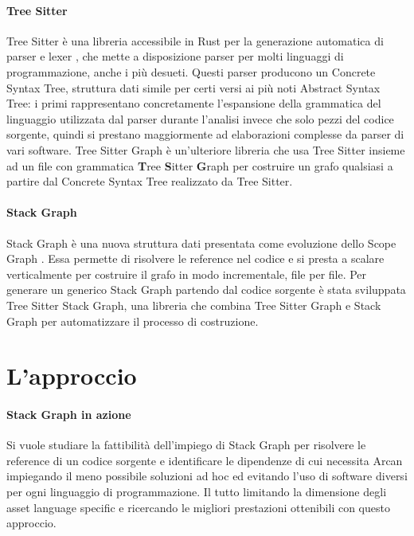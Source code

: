 \paragraph{Tree Sitter}

Tree Sitter \cite{TreeSitter} \`e una libreria accessibile in Rust per la generazione automatica di parser e lexer \cite{sestoft2017programming}, che mette a disposizione parser per molti linguaggi di programmazione, anche i pi\`u desueti. Questi parser producono un Concrete Syntax Tree, struttura dati simile per certi versi ai pi\`u noti Abstract Syntax Tree: i primi rappresentano concretamente l'espansione della grammatica del linguaggio utilizzata dal parser durante l'analisi invece che solo pezzi del codice sorgente, quindi si prestano maggiormente ad elaborazioni complesse da parser di vari software. Tree Sitter Graph \`e un'ulteriore libreria che usa Tree Sitter insieme ad un file con grammatica \textbf{T}ree \textbf{S}itter \textbf{G}raph per costruire un grafo qualsiasi a partire dal Concrete Syntax Tree realizzato da Tree Sitter.

\paragraph{Stack Graph}

Stack Graph \cite{StackGraph} \`e una nuova struttura dati presentata \cite{StackGraphNameResolutionAtScale} come evoluzione dello Scope Graph \cite{ScopeGraph}. Essa permette di risolvere le reference nel codice e si presta a scalare verticalmente per costruire il grafo in modo incrementale, file per file. Per generare un generico Stack Graph partendo dal codice sorgente \`e stata sviluppata Tree Sitter Stack Graph, una libreria che combina Tree Sitter Graph e Stack Graph per automatizzare il processo di costruzione.

\section{L'approccio}

\paragraph{Stack Graph in azione}

Si vuole studiare la fattibilit\`a dell'impiego di Stack Graph per risolvere le reference di un codice sorgente e identificare le dipendenze di cui necessita Arcan impiegando il meno possibile soluzioni ad hoc ed evitando l'uso di software diversi per ogni linguaggio di programmazione. Il tutto limitando la dimensione degli asset language specific e ricercando le migliori prestazioni ottenibili con questo approccio.

